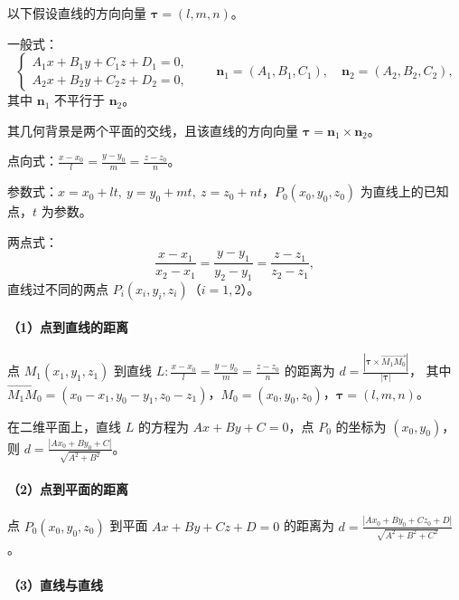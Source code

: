 
以下假设直线的方向向量 $\bm\tau=(l,m,n)$。

 一般式：
\[
\begin{cases}
A_1x+B_1y+C_1z+D_1=0,\\
A_2x+B_2y+C_2z+D_2=0,
\end{cases}
\qquad
\bm n_1=(A_1,B_1,C_1),\quad
\bm n_2=(A_2,B_2,C_2),
\]
其中 $\bm n_1$ 不平行于 $\bm n_2$。

\begin{notebox}
其几何背景是两个平面的交线，且该直线的方向向量 $\bm\tau=\bm n_1\times\bm n_2$。
\end{notebox}

 点向式：$\displaystyle
\frac{x-x_0}{l}=\frac{y-y_0}{m}=\frac{z-z_0}{n}$。

 参数式：$x=x_0+lt,\ y=y_0+mt,\ z=z_0+nt$，$P_0(x_0,y_0,z_0)$ 为直线上的已知点，$t$ 为参数。

 两点式：
\[
\frac{x-x_1}{x_2-x_1}
=\frac{y-y_1}{y_2-y_1}
=\frac{z-z_1}{z_2-z_1},
\]
直线过不同的两点 $P_i(x_i,y_i,z_i)$（$i=1,2$）。


\paragraph{（1）点到直线的距离}

点 $M_1(x_1,y_1,z_1)$ 到直线
$\displaystyle L:\frac{x-x_0}{l}=\frac{y-y_0}{m}=\frac{z-z_0}{n}$
的距离为
$\displaystyle d=\frac{|\bm\tau\times\overrightarrow{M_1M_0}|}{|\bm\tau|}$，
其中 $\overrightarrow{M_1M_0}=(x_0-x_1,y_0-y_1,z_0-z_1)$，$M_0=(x_0,y_0,z_0)$，$\bm\tau=(l,m,n)$。

\begin{notebox}
在二维平面上，直线 $L$ 的方程为 $Ax+By+C=0$，点 $P_0$ 的坐标为 $(x_0,y_0)$，则
$\displaystyle d=\frac{|Ax_0+By_0+C|}{\sqrt{A^2+B^2}}$。
\end{notebox}

\paragraph{（2）点到平面的距离}

点 $P_0(x_0,y_0,z_0)$ 到平面 $Ax+By+Cz+D=0$ 的距离为
$\displaystyle d=\frac{|Ax_0+By_0+Cz_0+D|}{\sqrt{A^2+B^2+C^2}}$。

\paragraph{（3）直线与直线}

